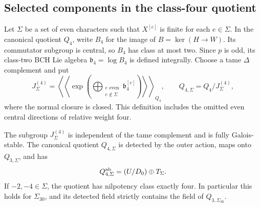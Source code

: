 \subsection{Selected components in the class-four quotient}
\label{subsec:selected-class-four}

Let $\Sigma$ be a set of even characters such that
$X^{[e]}$ is finite for each $e\in\Sigma$. In the
canonical quotient $Q_4$, write $B_4$ for the image
of $B=\ker(H\to W)$. Its commutator subgroup is
central, so $B_4$ has class at most two. Since $p$
is odd, its class-two BCH Lie algebra
$\mathfrak b_4=\log B_4$ is defined integrally.
Choose a tame $\Delta$ complement and put
\[
 J_\Sigma^{(4)}=
 \left\langle\!\left\langle
 \exp\!\left(\bigoplus_{\substack{e\text{ even}\\e\notin\Sigma}}
                         \mathfrak b_4^{[e]}\right)
 \right\rangle\!\right\rangle_{Q_4},\qquad
 Q_{4,\Sigma}=Q_4/J_\Sigma^{(4)},
\]
where the normal closure is closed. This definition
includes the omitted even central directions of
relative weight four.

\begin{proposition}\label{prop:selected-class-four}
The subgroup $J_\Sigma^{(4)}$ is independent of the
tame complement and is fully Galois-stable. The
canonical quotient $Q_{4,\Sigma}$ is detected by the
outer action, maps onto $Q_{3,\Sigma}$, and has
\[
             Q_{4,\Sigma}^{\rm ab}=(U/D_0)\oplus T_\Sigma.
\]
If $-2,-4\in\Sigma$, the quotient has nilpotency class
exactly four. In particular this holds for $\Sigma_{30}$,
and its detected field strictly contains the field
of $Q_{3,\Sigma_{30}}$.
\end{proposition}

